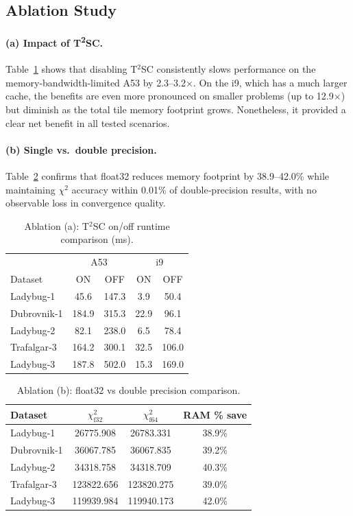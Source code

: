 \subsection{Ablation Study}
\label{subsec:results_ablation}
\paragraph{(a) Impact of T\textsuperscript{2}SC.} Table~\ref{tab:ablate_t2sc} shows that disabling 
T$^{2}$SC consistently slows performance on the memory-bandwidth-limited A53 by 2.3–3.2$\times$. 
On the i9, which has a much larger cache, the benefits are even more pronounced on smaller 
problems (up to 12.9$\times$) but diminish as the total tile memory footprint grows. Nonetheless, 
it provided a clear net benefit in all tested scenarios.

\paragraph{(b) Single vs.\ double precision.}  Table~\ref{tab:ablate_precision} confirms that 
float32 reduces memory footprint by 38.9–42.0\% while maintaining $\chi^{2}$ accuracy within 
0.01\% of double‑precision results, with no observable loss in convergence quality.

\begin{table}[h]
\caption{Ablation (a): T$^{2}$SC on/off runtime comparison (ms).}
\label{tab:ablate_t2sc}
\centering
\begin{tabular}{@{}lcccc@{}}
\toprule
& \multicolumn{2}{c}{A53} & \multicolumn{2}{c}{i9} \\
\cmidrule(lr){2-3} \cmidrule(lr){4-5}
Dataset & ON & OFF & ON & OFF \\
\midrule
Ladybug‑1   & 45.6  & 147.3 & 3.9  & 50.4 \\
Dubrovnik‑1 & 184.9 & 315.3 & 22.9 & 96.1 \\
Ladybug‑2   & 82.1  & 238.0 & 6.5  & 78.4 \\
Trafalgar‑3 & 164.2 & 300.1 & 32.5 & 106.0 \\
Ladybug‑3   & 187.8 & 502.0 &  15.3 & 169.0 \\
\bottomrule
\end{tabular}
\end{table}

\begin{table}[h]
\caption{Ablation (b): float32 vs double precision comparison.}
\label{tab:ablate_precision}
\centering
\begin{tabular}{@{}lccc@{}}
\toprule
Dataset & $\chi^{2}_{\text{f32}}$ & $\chi^{2}_{\text{f64}}$ & RAM \% save \\
\midrule
Ladybug‑1   & 26775.908 & 26783.331 & 38.9\% \\
Dubrovnik‑1 & 36067.785 & 36067.835 & 39.2\% \\
Ladybug‑2   & 34318.758 & 34318.709 & 40.3\% \\
Trafalgar‑3 & 123822.656 & 123820.275 & 39.0\% \\
Ladybug‑3   & 119939.984 & 119940.173 & 42.0\% \\
\bottomrule
\end{tabular}
\end{table}

